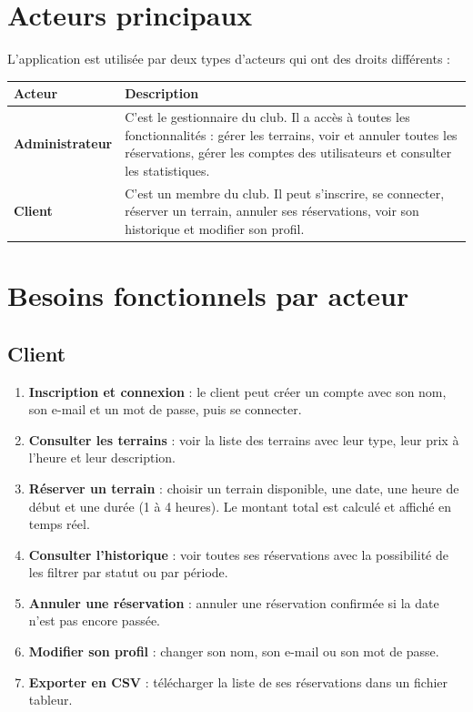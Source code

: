 \documentclass[12pt, a4paper]{report}
\begin{document}
\section{Acteurs principaux}

L'application est utilisée par deux types d'acteurs qui ont des droits différents :

\begin{center}
\begin{tabular}{>{\bfseries}p{3.8cm} p{9.2cm}}
\toprule
Acteur & Description \\
\midrule
Administrateur &
  C'est le gestionnaire du club. Il a accès à toutes les fonctionnalités :
  gérer les terrains, voir et annuler toutes les réservations, gérer les
  comptes des utilisateurs et consulter les statistiques. \\
\addlinespace
Client &
  C'est un membre du club. Il peut s'inscrire, se connecter, réserver un
  terrain, annuler ses réservations, voir son historique et modifier
  son profil. \\
\bottomrule
\end{tabular}
\end{center}

\section{Besoins fonctionnels par acteur}

\subsection{Client}

\begin{enumerate}
  \item \textbf{Inscription et connexion} : le client peut créer un compte
        avec son nom, son e-mail et un mot de passe, puis se connecter.
  \item \textbf{Consulter les terrains} : voir la liste des terrains avec
        leur type, leur prix à l'heure et leur description.
  \item \textbf{Réserver un terrain} : choisir un terrain disponible, une
        date, une heure de début et une durée (1 à 4 heures). Le montant
        total est calculé et affiché en temps réel.
  \item \textbf{Consulter l'historique} : voir toutes ses réservations avec
        la possibilité de les filtrer par statut ou par période.
  \item \textbf{Annuler une réservation} : annuler une réservation confirmée
        si la date n'est pas encore passée.
  \item \textbf{Modifier son profil} : changer son nom, son e-mail ou son
        mot de passe.
  \item \textbf{Exporter en CSV} : télécharger la liste de ses réservations
        dans un fichier tableur.
\end{enumerate}
\end{document}
